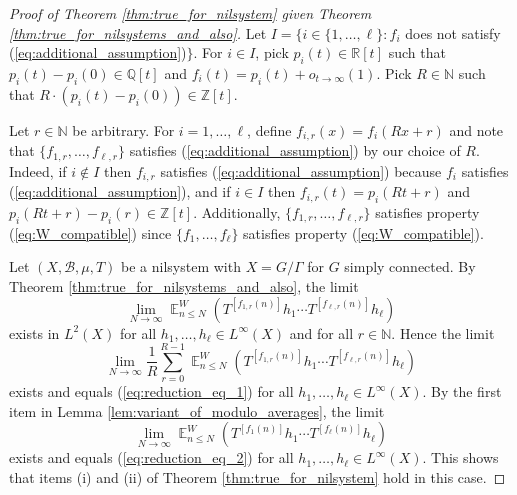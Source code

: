 \documentclass[12pt]{article}
\theoremstyle{plain} %
\theoremstyle{definition} %
\theoremstyle{plain}
\theoremstyle{plain}
\numberwithin{equation}{section}
\newcommand{\N}{\mathbb{N}}
\newcommand{\Z}{\mathbb{Z}}
\newcommand{\R}{\mathbb{R}}
\newcommand{\Q}{\mathbb{Q}}
\renewcommand{\leq}{\leqslant}
\newcommand{\1}{\mathbbm{1}}
\newcommand{\E}{\operatorname{\mathbb{E}}}
\newcommand{\oo}{\infty}
\newcommand{\round}[1]{[ #1 ]}
\begin{document}
\begin{proof}[Proof of Theorem \ref{thm:true_for_nilsystem} given Theorem \ref{thm:true_for_nilsystems_and_also}]
    Let $I = \{i\in \{1,\dots, \ell\}: f_i$ does not satisfy (\ref{eq:additional_assumption})$\}$.
    For $i\in I$, pick $p_i(t)\in \R[t]$ such that $p_i(t)-p_i(0)\in \Q[t]$ and $f_i(t) = p_i(t)+o_{t\to\oo}(1)$. Pick $R\in \N$ such that $R\cdot (p_i(t)-p_i(0))\in \Z[t]$. 

    Let $r\in \N$ be arbitrary. For $i=1,\dots, \ell$, define $f_{i,r}(x) = f_i(Rx+r)$ and note that $\{f_{1,r},\dots, f_{\ell,r}\}$ satisfies (\ref{eq:additional_assumption}) by our choice of $R$. Indeed, if $i\not\in I$ then $f_{i,r}$ satisfies (\ref{eq:additional_assumption}) because $f_i$ satisfies (\ref{eq:additional_assumption}), and if $i\in I$ then $f_{i,r}(t) = p_{i}(Rt+r)$ and $p_{i}(Rt+r)-p_i(r)\in \Z[t]$. Additionally, $\{f_{1,r},\dots, f_{\ell,r}\}$ satisfies property (\ref{eq:W_compatible}) since $\{f_{1},\dots, f_{\ell}\}$ satisfies property (\ref{eq:W_compatible}).
    


Let $(X,\mathscr{B},\mu,T)$ be a nilsystem with $X=G/\Gamma$ for $G$ simply connected. By Theorem \ref{thm:true_for_nilsystems_and_also}, the limit 
    \begin{equation}\label{eq:reduction_eq_1}
\lim_{N\to\oo}\E_{n\leq N}^W(T^{\round{f_{1,r}(n)}}h_1\cdots T^{\round{f_{\ell,r}(n)}}h_{\ell})
    \end{equation}
    exists in $L^2(X)$ for all $h_1,\dots, h_{\ell}\in L^{\oo}(X)$ and for all $r\in \N$. Hence the limit 
        \begin{equation}\label{eq:reduction_eq_2}
\lim_{N\to\oo}\frac{1}{R}\sum_{r=0}^{R-1}\E_{n\leq N}^W(T^{\round{f_{1,r}(n)}}h_1\cdots T^{\round{f_{\ell,r}(n)}}h_{\ell})
    \end{equation}
    exists and equals (\ref{eq:reduction_eq_1}) for all $h_1,\dots, h_{\ell}\in L^{\oo}(X)$. By the first item in Lemma \ref{lem:variant_of_modulo_averages}, the limit 
\begin{equation}\label{eq:reduction_eq_3}
\lim_{N\to\oo}\E_{n\leq N}^W(T^{\round{f_{1}(n)}}h_1\cdots T^{\round{f_{\ell}(n)}}h_{\ell})
\end{equation}
exists and equals (\ref{eq:reduction_eq_2}) for all $h_1,\dots, h_{\ell}\in L^{\oo}(X)$. This shows that items (i) and (ii) of Theorem \ref{thm:true_for_nilsystem} hold in this case.



\end{proof}
\end{document}
